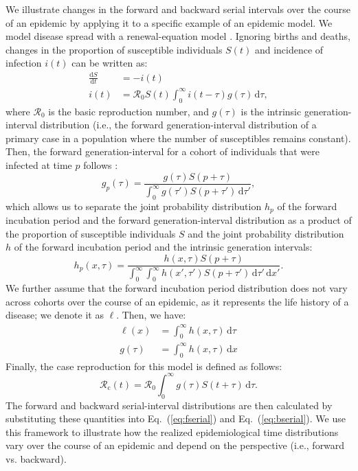 \documentclass[12pt]{article}
\newcommand{\eref}[1]{Eq.~(\ref{eq:#1})}
\newcommand{\Rx}[1]{\ensuremath{{\mathcal R}_{#1}}\xspace}
\newcommand{\Ro}{\Rx{0}}
\newcommand{\Rc}{\Rx{\mathrm{c}}}
\newcommand{\dd}[1]{\ensuremath{\, \mathrm{d}#1}}
\newcommand{\dtau}{\dd{\tau}}
\newcommand{\dx}{\dd{x}}
\newcommand{\psymp}{\ensuremath{p}} %
\newcommand{\gdist}{g} %
\newcommand{\idist}{\ell} %
\begin{document}
We illustrate changes in the forward and backward serial intervals over the course of an epidemic by applying it to a specific example of an epidemic model. 
We model disease spread with a renewal-equation model \citep{heesterbeek1996concept, diekmann2000mathematical, roberts2004modelling, aldis2005integral, roberts2007model, champredon2018equivalence}.
Ignoring births and deaths, changes in the proportion of susceptible individuals $S(t)$ and incidence of infection $i(t)$ can be written as:
\begin{align}
\frac{\mathrm{d}S}{\mathrm{d}t} &= - i(t)\nonumber\\
i(t) &= \Ro S(t) \int_0^\infty i(t-\tau) \gdist(\tau) \dtau,
\label{eq:renewal}
\end{align}
where \Ro is the basic reproduction number, and $\gdist(\tau)$ is the intrinsic generation-interval distribution (i.e., the forward generation-interval distribution of a primary case in a population where the number of susceptibles remains constant).
Then, the forward generation-interval for a cohort of individuals that were infected at time $\psymp$ follows \citep{champredon2015intrinsic}:
\begin{equation}
\gdist_\psymp (\tau) = \frac{ \gdist(\tau) S(\psymp + \tau)}{\int_0^\infty \gdist(\tau') S(\psymp + \tau') \dtau'},
\end{equation}
which allows us to separate the joint probability distribution $h_\psymp$ of the forward incubation period and the forward generation-interval distribution as a product of the proportion of susceptible individuals $S$ and the joint probability distribution $h$ of the forward incubation period and the intrinsic generation intervals:
\begin{equation}
h_\psymp (x, \tau) = \frac{h(x, \tau) S(\psymp + \tau)}{\int_0^\infty \int_0^\infty h(x', \tau') S(\psymp + \tau') \dtau' \dx'}.
\end{equation}
We further assume that the forward incubation period distribution does
not vary across cohorts over the course of an epidemic, as it
represents the life history of a disease; we denote it as $\idist$.
Then, we have:
\begin{align}
\idist(x) &= \int_0^\infty h(x, \tau) \dtau\nonumber\\
\gdist(\tau) &= \int_0^\infty h(x, \tau) \dx
\label{eq:marginal}
\end{align}
Finally, the case reproduction for this model is defined as follows:
\begin{equation}
\Rc(t) = \Ro \int_0^\infty \gdist(\tau) S(t+\tau) \dtau.
\end{equation}
The forward and backward serial-interval distributions are then calculated by substituting these quantities into \eref{fserial} and \eref{bserial}.
We use this framework to illustrate how the realized epidemiological time distributions vary over the course of an epidemic and depend on the perspective (i.e., forward vs. backward).
\end{document}
